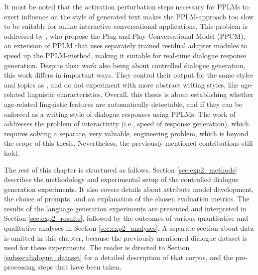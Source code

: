 It must be noted that the activation perturbation steps necessary for PPLMs to exert influence on the style of generated text makes the PPLM-approach too slow to be suitable for online interactive conversational applications. This problem is addressed by \cite{madotto-etal-2020-plug}, who propose the Plug-and-Play Conversational Model (PPCM), an extension of PPLM that uses separately trained residual adapter modules to speed up the PPLM-method, making it suitable for real-time dialogue response generation. Despite their work also being about controlled dialogue generation, this work differs in important ways. They control their output for the same styles and topics as \cite{dathathri2019plug}, and do not experiment with more abstract writing styles, like age-related linguistic characteristics. Overall, this thesis is about establishing whether age-related linguistic features are automatically detectable, and if they can be enforced as a writing style of dialogue responses using PPLMs. The work of \cite{madotto-etal-2020-plug} addresses the problem of interactivity (i.e., speed of response generation), which requires solving a separate, very valuable, engineering problem, which is beyond the scope of this thesis. Nevertheless, the previously mentioned contributions still hold.

The rest of this chapter is structured as follows. Section \ref{sec:exp2_methods} describes the methodology and experimental setup of the controlled dialogue generation experiments. It also covers details about attribute model development, the choice of prompts, and an explanation of the chosen evaluation metrics. The results of the language generation experiments are presented and interpreted in Section \ref{sec:exp2_results}, followed by the outcomes of various quantitative and qualitative analyses in Section \ref{sec:exp2_analyses}. A separate section about data is omitted in this chapter, because the previously mentioned dialogue dataset is used for these experiments. The reader is directed to Section \ref{subsec:dialogue_dataset} for a detailed description of that corpus, and the pre-processing steps that have been taken.



